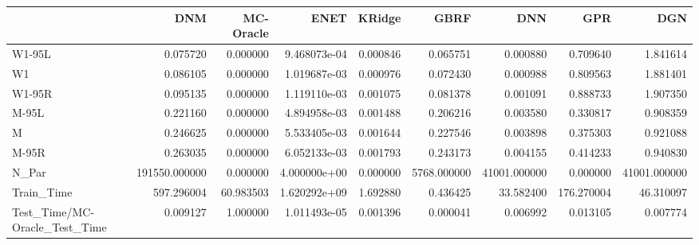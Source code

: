 \begin{tabular}{lrrrrrrrr}
\toprule
{} &            DNM &  MC-Oracle &          ENET &    KRidge &         GBRF &           DNN &         GPR &           DGN \\
\midrule
W1-95L                        &       0.075720 &   0.000000 &  9.468073e-04 &  0.000846 &     0.065751 &      0.000880 &    0.709640 &      1.841614 \\
W1                            &       0.086105 &   0.000000 &  1.019687e-03 &  0.000976 &     0.072430 &      0.000988 &    0.809563 &      1.881401 \\
W1-95R                        &       0.095135 &   0.000000 &  1.119110e-03 &  0.001075 &     0.081378 &      0.001091 &    0.888733 &      1.907350 \\
M-95L                         &       0.221160 &   0.000000 &  4.894958e-03 &  0.001488 &     0.206216 &      0.003580 &    0.330817 &      0.908359 \\
M                             &       0.246625 &   0.000000 &  5.533405e-03 &  0.001644 &     0.227546 &      0.003898 &    0.375303 &      0.921088 \\
M-95R                         &       0.263035 &   0.000000 &  6.052133e-03 &  0.001793 &     0.243173 &      0.004155 &    0.414233 &      0.940830 \\
N\_Par                         &  191550.000000 &   0.000000 &  4.000000e+00 &  0.000000 &  5768.000000 &  41001.000000 &    0.000000 &  41001.000000 \\
Train\_Time                    &     597.296004 &  60.983503 &  1.620292e+09 &  1.692880 &     0.436425 &     33.582400 &  176.270004 &     46.310097 \\
Test\_Time/MC-Oracle\_Test\_Time &       0.009127 &   1.000000 &  1.011493e-05 &  0.001396 &     0.000041 &      0.006992 &    0.013105 &      0.007774 \\
\bottomrule
\end{tabular}
